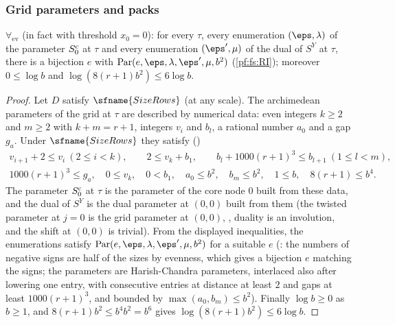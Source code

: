 \subsubsection{Grid parameters and packs}

\begin{proposition}\label{pf:fs:gridPar}
$\forall_{\mathrm{ev}}$ (in fact with threshold $x_0=0$): for every $\tau$, every enumeration $(\eps,\lambda)$ of the parameter $S^{\mathrm{c}}_0$ at $\tau$
and every enumeration $(\eps',\mu)$ of the dual of $S^Y$ at $\tau$, there is a bijection $e$ with $\mathrm{Par}(e,\eps,\lambda,\eps',\mu,b^2)$
(\cref{pf:fs:RI}); moreover $0\le\log b$ and $\log(8(r+1)b^2)\le6\log b$.
\end{proposition}

\begin{proof}
Let $D$ satisfy $\sfname{SizeRows}$ (at any scale). The archimedean parameters of the grid at $\tau$ are described by numerical data: even
integers $k\ge2$ and $m\ge2$ with $k+m=r+1$, integers $v_i$ and $b_l$, a rational number $a_0$ and a gap $g_a$. Under $\sfname{SizeRows}$ they
satisfy ()
\begin{gather*}
v_{i+1}+2\le v_i\ (2\le i<k),\qquad 2\le v_k+b_1,\qquad b_l+1000(r+1)^3\le b_{l+1}\ (1\le l<m),\\
1000(r+1)^3\le g_a,\quad 0\le v_k,\quad 0<b_1,\quad a_0\le b^2,\quad b_m\le b^2,\quad 1\le b,\quad 8(r+1)\le b^4 .
\end{gather*}
The parameter $S^{\mathrm{c}}_0$ at $\tau$ is the parameter of the core node $0$ built from these data, and the dual of $S^Y$ is the dual parameter at
$(0,0)$ built from them (the twisted parameter at $j=0$ is the grid parameter at $(0,0)$, , duality
is an involution, and the shift at $(0,0)$ is trivial). From the displayed inequalities, the enumerations satisfy
$\mathrm{Par}(e,\eps,\lambda,\eps',\mu,b^2)$ for a suitable $e$ (: the numbers of
negative signs are half of the sizes by evenness, which gives a bijection $e$ matching the signs; the parameters are Harish-Chandra parameters,
interlaced also after lowering one entry, with consecutive entries at distance at least $2$ and gaps at least $1000(r+1)^3$, and bounded by
$\max(a_0,b_m)\le b^2$). Finally $\log b\ge0$ as $b\ge1$, and $8(r+1)b^2\le b^4b^2=b^6$ gives $\log(8(r+1)b^2)\le6\log b$.
\end{proof}

